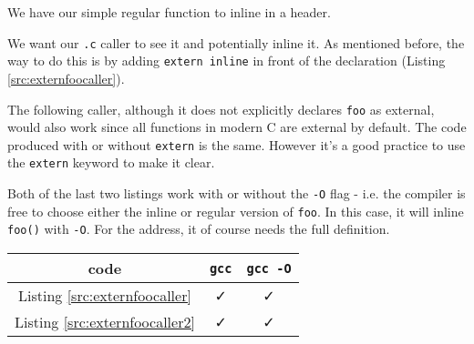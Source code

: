 \begin{exmp}
We have our simple regular function to inline in a header.

We want our \texttt{.c} caller to see it and potentially inline it. As mentioned before, the way to do this is by adding \texttt{extern inline} in front of the declaration (Listing \ref{src:externfoocaller}).

The following caller, although it does not explicitly declares \texttt{foo} as external, would also work since all functions in modern C are external by default. The code produced with or without \texttt{extern} is the same. However it's a good practice to use the \texttt{extern} keyword to make it clear.

\textup{
Both of the last two listings work with or without the \texttt{-O} flag - i.e. the compiler is free to choose either the inline or regular version of \texttt{foo}. In this case, it will inline \texttt{foo()} with \texttt{-O}. For the address, it of course needs the full definition.
}
\begin{center}%
    \begin{tabular}
    [c]{c|c|c}%
    code  & \texttt{gcc} & \texttt{gcc -O} \\\hline
    Listing \ref{src:externfoocaller} & \faCheck & \faCheck \\
    Listing \ref{src:externfoocaller2} & \faCheck & \faCheck \\
    \end{tabular}
\end{center}
\end{exmp}

